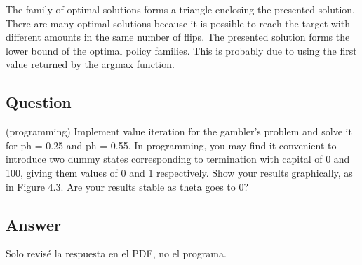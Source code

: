 \documentclass[11pt]{article}
\def\red{\color{red}}
\begin{document}
    The family of optimal solutions forms a triangle enclosing the presented solution.
    There are many optimal solutions because it is possible to reach the target with different amounts in the same number of flips.
    The presented solution forms the lower bound of the optimal policy families.
    This is probably due to using the first value returned by the argmax function.


    \subsection{Question}

    (programming) Implement value iteration for the gambler’s problem and solve it for ph = 0.25 and ph = 0.55.
    In programming, you may find it convenient to introduce two dummy states corresponding to termination with capital of 0 and 100, giving them values of 0 and 1 respectively.
    Show your results graphically, as in Figure 4.3.
    Are your results stable as theta goes to 0?

    \subsection*{Answer}

    {\red Solo revisé la respuesta en el PDF, no el programa.}
\end{document}
